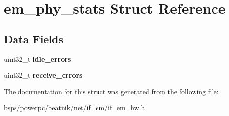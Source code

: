 \hypertarget{structem__phy__stats}{}\section{em\+\_\+phy\+\_\+stats Struct Reference}
\label{structem__phy__stats}
\subsection*{Data Fields}
\begin{DoxyCompactItemize}
\item 
\mbox{\label{structem__phy__stats_abed26b2e52d4f3cd88f5709077bf95fc}} 
uint32\+\_\+t {\bfseries idle\+\_\+errors}
\item 
\mbox{\label{structem__phy__stats_aa3711e02f2c4cd4e4c5c242ee6244eb3}} 
uint32\+\_\+t {\bfseries receive\+\_\+errors}
\end{DoxyCompactItemize}


The documentation for this struct was generated from the following file\+:\begin{DoxyCompactItemize}
\item 
bsps/powerpc/beatnik/net/if\+\_\+em/if\+\_\+em\+\_\+hw.\+h\end{DoxyCompactItemize}
